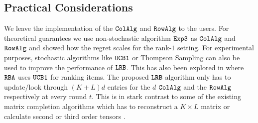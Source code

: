 \subsection{Practical Considerations}
\label{sec:practical considerations}




We leave the implementation of the ${\tt ColAlg}$ and ${\tt RowAlg}$ to the users. For theoretical guarantees we use non-stochastic algorithm ${\tt Exp3}$ as ${\tt ColAlg}$ and ${\tt RowAlg}$ and showed how the regret scales for the rank-$1$ setting. For experimental purposes, stochastic algorithms like ${\tt UCB1}$ or Thompson Sampling can also be used to improve the performance of ${\tt LRB}$. This has also been explored in \citet{radlinski2008learning} where ${\tt RBA}$ uses ${\tt UCB1}$ for ranking items. The proposed ${\tt LRB}$ algorithm only has to update/look through $(K + L)d$ entries for the $d$ ${\tt ColAlg}$ and the ${\tt RowAlg}$ respectively at every round $t$. This is in stark contrast to some of the existing matrix completion algorithms which has to reconstruct a $K\times L$ matrix \citep{sen2016contextual} or calculate second or third order tensors \citep{gopalan2016low}. 


